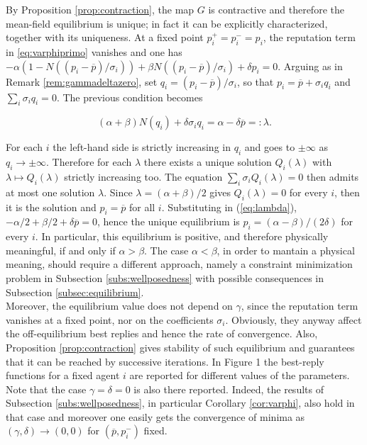 \documentclass[graybox]{svmult}
\begin{document}
\begin{remark}
\label{rmrk:calculation}
By Proposition \ref{prop:contraction}, the map $G$ is contractive and therefore the mean-field equilibrium is unique; in fact it can be explicitly characterized, together with its uniqueness. At a fixed point $p_i^+=p_i^-=p_i$, the reputation term in \eqref{eq:varphiprimo} vanishes and one has
$-\alpha(1-N((p_i-\overline p)/\sigma_i))+\beta N((p_i-\overline p)/\sigma_i)+\delta p_i=0$.
Arguing as in Remark \ref{rem:gammadeltazero}, set $q_i=(p_i-\overline p)/\sigma_i$, so that $p_i=\overline p+\sigma_iq_i$ and $\sum_i\sigma_iq_i=0$.
The previous condition becomes 

\begin{equation}
    \label{eq:lambda}
(\alpha+\beta)N(q_i)+\delta\sigma_iq_i=\alpha-\delta\overline p=:\lambda.
\end{equation}

\noindent
For each $i$ the left-hand side is strictly increasing in $q_i$ and goes to $\pm\infty$ as $q_i\to\pm\infty$. Therefore for each $\lambda$ there exists a unique solution $Q_i(\lambda)$ with $\lambda\mapsto Q_i(\lambda)$ strictly increasing too. The equation $\sum_i\sigma_iQ_i(\lambda)=0$ then admits at most one solution $\lambda$.
Since $\lambda=(\alpha+\beta)/2$ gives $Q_i(\lambda)=0$ for every $i$, then it is the solution and $p_i=\overline p$ for all $i$. Substituting in (\ref{eq:lambda}),  $-\alpha/2+\beta/2+\delta\overline p=0$, hence the unique equilibrium is
$p_i=(\alpha-\beta)/(2\delta)$ for every $i$.
In particular, this equilibrium is positive, and therefore physically meaningful, if and only if $\alpha>\beta$. The case $\alpha<\beta$, in order to mantain a physical meaning, should require a different approach, namely a constraint minimization problem in Subsection \ref{subs:wellposedness} with possible consequences in Subsection \ref{subsec:equilibrium}.\\ 
Moreover, the equilibrium value does not depend on $\gamma$, since the reputation term vanishes at a fixed point, nor on the coefficients $\sigma_i$. Obviously, they anyway affect the off-equilibrium best replies and hence the rate of convergence. Also, Proposition \ref{prop:contraction} gives stability of such equilibrium and guarantees that it can be reached by successive iterations. In Figure 1 the best-reply functions for a fixed agent $i$ are reported for different values of the parameters. Note that the case $\gamma=\delta=0$ is also there reported. Indeed, the results of Subsection \ref{subs:wellposedness}, in particular Corollary \ref{cor:varphi}, also hold in that case and moreover one easily gets the convergence of minima as $(\gamma,\delta)\to(0,0)$ for $(\overline p, p_i^-)$ fixed.

\end{remark}
\end{document}
